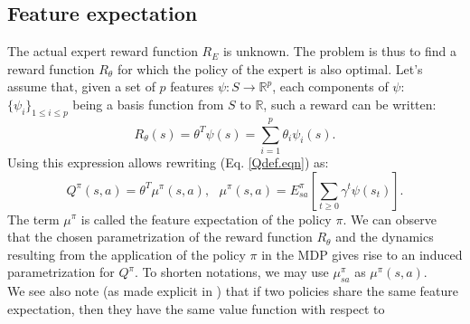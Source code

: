 \documentclass{article}
\begin{document}
\subsection{Feature expectation}
\label{ConsiderationsTechniques.sec}
The actual expert reward function $R_E$ is unknown. The problem is
 thus to find a reward function $R_\theta$ for which the policy of
the expert is also optimal. Let's assume that, given a set of $p$
features $\psi: S\rightarrow \mathbb{R}^p$, each components of
$\psi$: $\{\psi_i\}_{1\leq i \leq p}$ being a basis function from
$S$ to $\mathbb{R}$, such a reward can be written:
\begin{equation}
\label{hatRdef.eqn} %
R_\theta(s) = \theta^T\psi(s) =
\sum_{i=1}^p\theta_i\psi_i(s).
\end{equation}
Using this expression allows rewriting (Eq. \eqref{Qdef.eqn}) as:
\begin{equation}
Q^\pi(s,a)=\theta^T\mu^\pi(s,a),\text{ }\mu^\pi(s,a) =
E^\pi_{sa}[\sum_{t\geq 0}\gamma^t\psi(s_t)]. \label{Qmu.eqn}
\end{equation}
%
The term $\mu^\pi$ is called the feature expectation of the policy
$\pi$. We can observe that the chosen parametrization of the reward
function $R_\theta$ and the dynamics resulting from the application
of the policy $\pi$ in the MDP gives rise to an induced
parametrization for $Q^\pi$. To
shorten notations, we may use $\mu^\pi_{sa}$ as $\mu^\pi(s,a)$.\\
%
We see also note (as made explicit in \cite{abbeel2004apprenticeship}) that if two policies share the same feature
expectation, then they have the same value function with respect to
\end{document}
